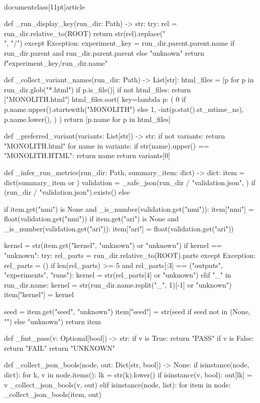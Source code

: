 \\documentclass[11pt]{article}
\begin{document}
\begin{CodeBlock}
{def _run_display_key(run_dir: Path) -> str:
    try:
        rel = run_dir.relative_to(ROOT)
        return str(rel).replace("\\", "/")
    except Exception:
        experiment_key = run_dir.parent.parent.name if run_dir.parent and run_dir.parent.parent else "unknown"
        return f"{experiment_key}/{run_dir.name}"


def _collect_variant_names(run_dir: Path) -> List[str]:
    html_files = [p for p in run_dir.glob("*.html") if p.is_file()]
    if not html_files:
        return ["MONOLITH.html"]
    html_files.sort(
        key=lambda p: (
            0 if p.name.upper().startswith("MONOLITH") else 1,
            -int(p.stat().st_mtime_ns),
            p.name.lower(),
        )
    )
    return [p.name for p in html_files]


def _preferred_variant(variants: List[str]) -> str:
    if not variants:
        return "MONOLITH.html"
    for name in variants:
        if str(name).upper() == "MONOLITH.HTML":
            return name
    return variants[0]


def _infer_run_metrics(run_dir: Path, summary_item: dict) -> dict:
    item = dict(summary_item or {})
    validation = _safe_json(run_dir / "validation.json", {}) if (run_dir / "validation.json").exists() else {}

    if item.get("nmi") is None and _is_number(validation.get("nmi")):
        item["nmi"] = float(validation.get("nmi"))
    if item.get("ari") is None and _is_number(validation.get("ari")):
        item["ari"] = float(validation.get("ari"))

    kernel = str(item.get("kernel", "unknown") or "unknown")
    if kernel == "unknown":
        try:
            rel_parts = run_dir.relative_to(ROOT).parts
        except Exception:
            rel_parts = ()
        if len(rel_parts) >= 5 and rel_parts[:3] == ("outputs", "experiments", "runs"):
            kernel = str(rel_parts[4] or "unknown")
        elif "_" in run_dir.name:
            kernel = str(run_dir.name.rsplit("_", 1)[-1] or "unknown")
        item["kernel"] = kernel

    seed = item.get("seed", "unknown")
    item["seed"] = str(seed if seed not in (None, "") else "unknown")
    return item


def _fmt_pass(v: Optional[bool]) -> str:
    if v is True:
        return "PASS"
    if v is False:
        return "FAIL"
    return "UNKNOWN"


def _collect_json_bools(node, out: Dict[str, bool]) -> None:
    if isinstance(node, dict):
        for k, v in node.items():
            lk = str(k).lower()
            if isinstance(v, bool):
                out[lk] = v
            _collect_json_bools(v, out)
    elif isinstance(node, list):
        for item in node:
            _collect_json_bools(item, out)


}
\end{CodeBlock}
\end{document}

